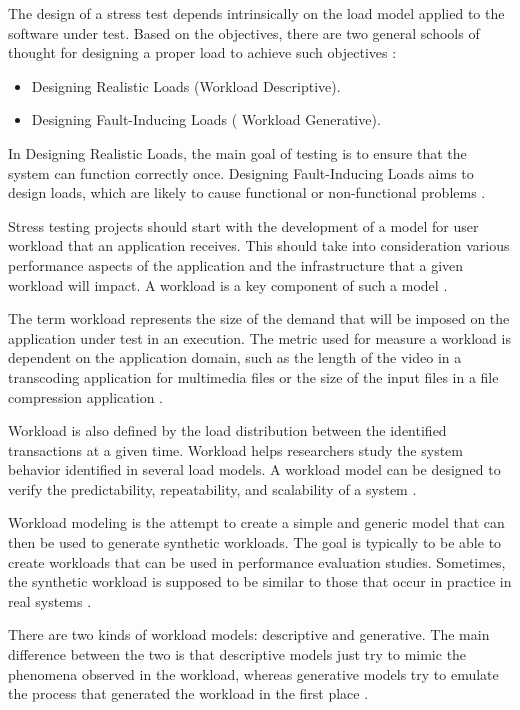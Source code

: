 The design of a stress test depends intrinsically on the load model applied to the software under test. Based on the objectives, there are two general schools of thought for designing a proper load to achieve such objectives \cite{Afzal2009a}:

\begin{itemize}
\item Designing Realistic Loads (Workload Descriptive). 
\item Designing Fault-Inducing Loads ( Workload Generative).
\end{itemize}

In Designing Realistic Loads, the main goal of testing is to ensure that the system can function correctly once. Designing Fault-Inducing Loads  aims to design loads, which are likely to cause functional or non-functional problems \cite{Afzal2009a}.

Stress testing projects should start with the development of a model for user workload that an application receives. This should take into consideration various performance aspects of the application and the infrastructure that a given workload will impact. A workload is a key component of such a model \cite{Molyneaux2009}.

The term workload represents the size of the demand that will be imposed on the application under test in an execution. The metric  used for measure a workload is dependent on the application domain, such as the length of the video in a transcoding application for multimedia files or the size of the input files in a file compression application \cite{Feitelson2013} \cite{Molyneaux2009} \cite{Goncalves2014}. 

Workload is also defined by the load distribution between the identified transactions at a given time. Workload helps researchers study the system behavior identified in several load models. A workload model can be designed to verify the predictability, repeatability, and scalability of a system \cite{Feitelson2013} \cite{Molyneaux2009}.


Workload modeling is the attempt to create a simple and generic model that can then be used to generate synthetic workloads. The goal is typically to be able to create workloads that can be used in performance evaluation studies. Sometimes, the synthetic workload is supposed to be similar to those that occur in practice in real systems \cite{Feitelson2013} \cite{Molyneaux2009}.

There are two kinds of workload models: descriptive and generative. The main difference between the two is that descriptive models just try to mimic the phenomena observed in the workload, whereas generative models try to emulate the process that generated the workload in the first place \cite{DiLucca2006}. 

